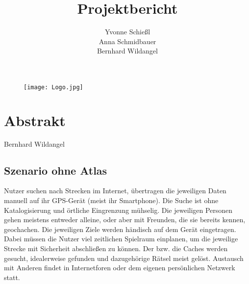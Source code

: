 \documentclass[a4paper, 12pt]{article}
\title{\textbf{Projektbericht}}
\author{ Yvonne Schießl \\
		Anna Schmidbauer\\
		Bernhard Wildangel}
\date{}
\begin{document}
\maketitle

\begin{figure}[H] 
	\begin{minipage}{15cm} 
	   \texttt{[image: Logo.jpg]} 
	\end{minipage}
\end{figure}
\newpage

\tableofcontents
\newpage
\section{Abstrakt} Bernhard Wildangel\\


\subsection{Szenario ohne Atlas}
Nutzer suchen nach Strecken im Internet, übertragen die jeweiligen Daten manuell auf ihr GPS-Gerät (meist ihr Smartphone). Die Suche ist ohne Katalogisierung und örtliche Eingrenzung mühselig. Die jeweiligen Personen gehen meistens entweder alleine, oder aber mit Freunden, die sie bereits kennen, geochachen. Die jeweiligen Ziele werden händisch auf dem Gerät eingetragen. Dabei müssen die Nutzer viel zeitlichen Spielraum einplanen, um die jeweilige Strecke mit Sicherheit abschließen zu können. Der bzw. die Caches werden gesucht, idealerweise gefunden und dazugehörige Rätsel meist gelöst.
Austausch mit Anderen findet in Internetforen oder dem eigenen persönlichen Netzwerk statt.
\end{document}
